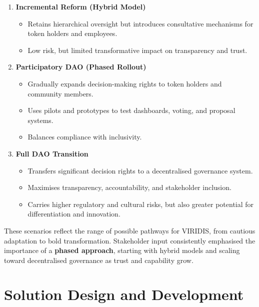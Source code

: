 \documentclass[
  english,
  12pt,
  oneside,
  open=any]{scrbook}
\providecommand{\tightlist}{%
  \setlength{\itemsep}{0pt}\setlength{\parskip}{0pt}}\usepackage{longtable,booktabs,array}
\begin{document}
\begin{enumerate}
\def\labelenumi{\arabic{enumi}.}
\tightlist
\item
  \textbf{Incremental Reform (Hybrid Model)}

  \begin{itemize}
  \tightlist
  \item
    Retains hierarchical oversight but introduces consultative
    mechanisms for token holders and employees.\\
  \item
    Low risk, but limited transformative impact on transparency and
    trust.
  \end{itemize}
\item
  \textbf{Participatory DAO (Phased Rollout)}

  \begin{itemize}
  \tightlist
  \item
    Gradually expands decision-making rights to token holders and
    community members.\\
  \item
    Uses pilots and prototypes to test dashboards, voting, and proposal
    systems.\\
  \item
    Balances compliance with inclusivity.
  \end{itemize}
\item
  \textbf{Full DAO Transition}

  \begin{itemize}
  \tightlist
  \item
    Transfers significant decision rights to a decentralised governance
    system.\\
  \item
    Maximises transparency, accountability, and stakeholder inclusion.\\
  \item
    Carries higher regulatory and cultural risks, but also greater
    potential for differentiation and innovation.
  \end{itemize}
\end{enumerate}

These scenarios reflect the range of possible pathways for VIRIDIS, from
cautious adaptation to bold transformation. Stakeholder input
consistently emphasised the importance of a \textbf{phased approach},
starting with hybrid models and scaling toward decentralised governance
as trust and capability grow.

\chapter{Solution Design and Development}\label{sec-solution}
\end{document}
